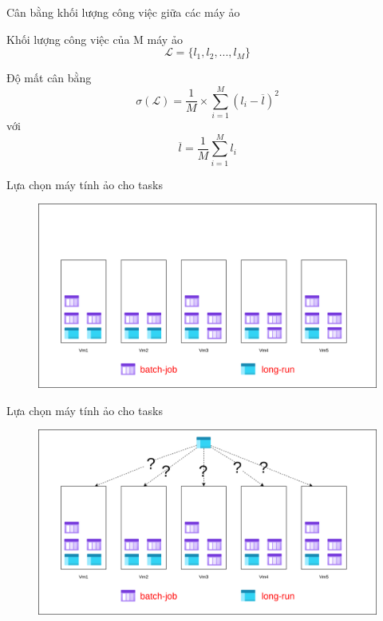 \documentclass[11pt,xcolor={dvipsnames}, aspectratio=169]{beamer}
\begin{document}
\begin{frame}
{Cân bằng khối lượng công việc giữa các máy ảo}
\pause
\begin{block}
{Khối lượng công việc của M máy ảo}
\[
	\mathcal{L} = \{l_{1}, l_{2}, ..., l_{M}\}
\]
\end{block}
\pause
\begin{block}
{Độ mất cân bằng}
\[
	\sigma(\mathcal{L}) = \frac{1}{M} \times \sum_{i = 1}^{M}(l_{i} - \overline{l})^{2}
\]
với 
\[
	\overline{l} = \frac{1}{M}\sum_{i = 1}^{M}l_{i}
\]
\end{block}
\end{frame}

\begin{frame}
{Lựa chọn máy tính ảo cho tasks}
	\begin{figure}
		\vspace{1cm}
		\includegraphics[scale=0.4]{images/balancing_tasks1.png}
	\end{figure}
\end{frame}

\begin{frame}
{Lựa chọn máy tính ảo cho tasks}
	\begin{figure}
		\vspace{1cm}
		\includegraphics[scale=0.4]{images/balancing_tasks2.png}
	\end{figure}
\end{frame}
\end{document}

